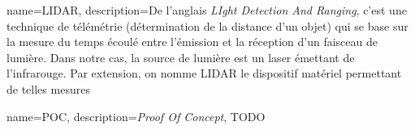 \makeglossaries

{
	name={LIDAR},
	description={De l'anglais \emph{LIght Detection And Ranging}, c'est une technique de télémétrie (détermination de la distance d'un objet) qui se base sur la mesure du temps écoulé entre l'émission et la réception d'un faisceau de lumière. Dans notre cas, la source de lumière est un laser émettant de l'infrarouge. Par extension, on nomme LIDAR le dispositif matériel permettant de telles mesures}
}

{
	name={POC},
	description={\emph{Proof Of Concept}, TODO}
}
